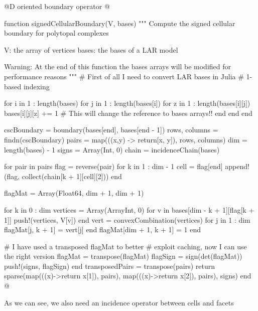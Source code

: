 \documentclass[11pt,oneside]{article}	%
\begin{document}
@D oriented boundary operator
@{function signedCellularBoundary(V, bases)
  """
  Compute the signed cellular boundary
  for polytopal complexes

  V: the array of vertices
  bases: the bases of a LAR model
  
  Warning: At the end of this function the bases arrays
  will be modified for performance reasons
  """
  # First of all I need to convert LAR bases in Julia
  # 1-based indexing

  for i in 1 : length(bases)
    for j in 1 : length(bases[i])
      for z in 1 : length(bases[i][j])
        bases[i][j][z] += 1 # This will change the reference to bases arrays!!
      end
    end
  end

  cscBoundary = boundary(bases[end], bases[end - 1])
  rows, columns = findn(cscBoundary)
  pairs = map(((x,y) -> return[x, y]), rows, columns)
  dim = length(bases) - 1
  signs = Array(Int, 0)
  chain = incidenceChain(bases)

  for pair in pairs
    flag = reverse(pair)
    for k in 1 : dim - 1
      cell = flag[end]
      append!(flag, collect(chain[k + 1][cell][2]))
    end
    
    flagMat = Array(Float64, dim + 1, dim + 1)
    
    for k in 0 : dim
      vertices = Array(Array{Int}, 0)
      for v in bases[dim - k + 1][flag[k + 1]]
        push!(vertices, V[v])
      end
      vert = convexCombination(vertices)
      for j in 1 : dim
        flagMat[j, k + 1] = vert[j]
      end
      flagMat[dim + 1, k + 1] = 1
    end
    
    # I have used a transposed flagMat to better
    # exploit caching, now I can use the right version
    flagMat = transpose(flagMat)
    flagSign = sign(det(flagMat))
    push!(signs, flagSign)
  end
  transposedPairs = transpose(pairs)
  return sparse(map(((x)->return x[1]), pairs), map(((x)->return x[2]), pairs), signs)
end @}

As we can see, we also need an incidence operator between cells and facets
\end{document}
